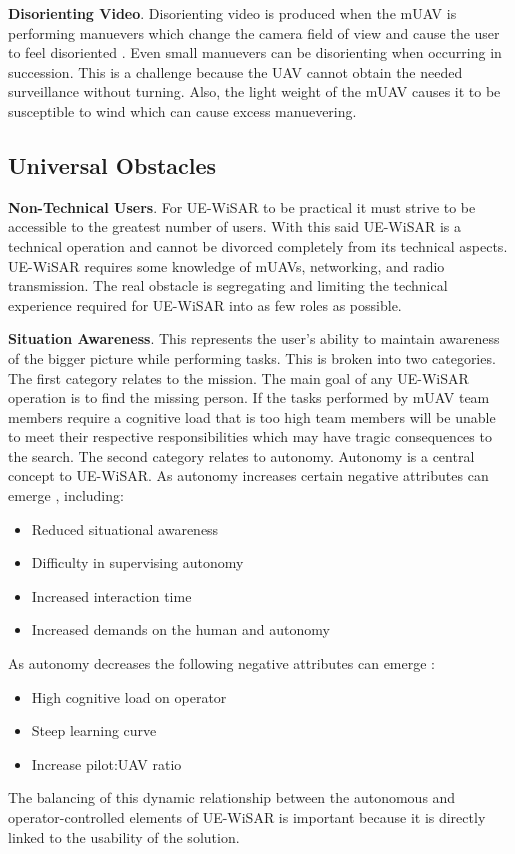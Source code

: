 \documentclass[12pt]{IEEEtran}
\begin{document}
\textbf{Disorienting Video}.  Disorienting video is produced when the mUAV is
performing manuevers which change the camera field of view and cause the user to feel
disoriented \cite{morse2008application}.  Even small manuevers can be
disorienting when occurring in succession.
This is a challenge because the UAV cannot obtain the needed surveillance
without turning.  Also, the light weight of the mUAV causes it to be
susceptible to wind which can cause excess manuevering.

\subsection{Universal Obstacles}
\textbf{Non-Technical Users}.  For UE-WiSAR to be
practical it must strive to be accessible to the greatest number of users.  With
this said UE-WiSAR is a technical operation and cannot be divorced completely
from its technical aspects.  UE-WiSAR requires some knowledge of mUAVs,
networking, and radio transmission. The real obstacle is segregating
and limiting the technical experience required for UE-WiSAR into as few roles as
possible.

\textbf{Situation Awareness}.  This represents the user's ability to maintain
awareness of the bigger picture while performing tasks.  This is broken into
two categories.  The first category relates to the mission.  The main goal of
any UE-WiSAR operation is to find the missing person.  If the tasks performed by
mUAV team members require a cognitive load that is too high team members will be
unable to meet their respective responsibilities which may have tragic
consequences to the search.  The second category relates to autonomy.  Autonomy
is a central concept to UE-WiSAR.  As autonomy increases certain negative
attributes can emerge  \cite{adams2007camera}, including:
\begin{itemize}
	\item Reduced situational awareness
	\item Difficulty in supervising autonomy
	\item Increased interaction time
	\item Increased demands on the human and autonomy
\end{itemize}
As autonomy decreases the following negative attributes
can emerge \cite{cooper2006integrating}:
\begin{itemize}
	\item High cognitive load on operator
	\item Steep learning curve
	\item Increase pilot:UAV ratio
\end{itemize}
The balancing of this dynamic relationship between the autonomous and
operator-controlled elements of UE-WiSAR is important because it is directly
linked to the usability of the solution.
\end{document}
